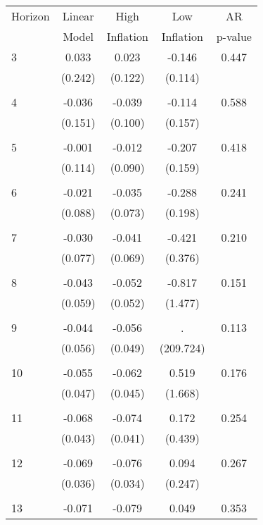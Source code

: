 \begin{tabular}{l*{1}{cccc}}
\hline\hline
 Horizon  & Linear & High                 & Low           & AR            \\
                  & Model         & Inflation & Inflation & p-value       \\
\hline
   3       & 0.033 & 0.023 & -0.146 & 0.447 \\
          & (0.242) & (0.122) & (0.114) & \\
 & & & &\\
   4       & -0.036 & -0.039 & -0.114 & 0.588 \\
          & (0.151) & (0.100) & (0.157) & \\
 & & & &\\
   5       & -0.001 & -0.012 & -0.207 & 0.418 \\
          & (0.114) & (0.090) & (0.159) & \\
 & & & &\\
   6       & -0.021 & -0.035 & -0.288 & 0.241 \\
          & (0.088) & (0.073) & (0.198) & \\
 & & & &\\
   7       & -0.030 & -0.041 & -0.421 & 0.210 \\
          & (0.077) & (0.069) & (0.376) & \\
 & & & &\\
   8       & -0.043 & -0.052 & -0.817 & 0.151 \\
          & (0.059) & (0.052) & (1.477) & \\
 & & & &\\
   9       & -0.044 & -0.056 &     . & 0.113 \\
          & (0.056) & (0.049) & (209.724) & \\
 & & & &\\
  10       & -0.055 & -0.062 & 0.519 & 0.176 \\
          & (0.047) & (0.045) & (1.668) & \\
 & & & &\\
  11       & -0.068 & -0.074 & 0.172 & 0.254 \\
          & (0.043) & (0.041) & (0.439) & \\
 & & & &\\
  12       & -0.069 & -0.076 & 0.094 & 0.267 \\
          & (0.036) & (0.034) & (0.247) & \\
 & & & &\\
  13       & -0.071 & -0.079 & 0.049 & 0.353 \\

\end{tabular}
